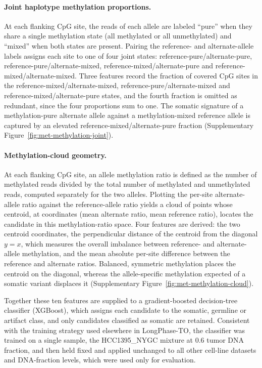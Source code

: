 \documentclass[pdflatex,sn-nature]{sn-jnl}
\begin{document}
\paragraph{Joint haplotype methylation proportions.} At each flanking CpG site, the reads of each allele are labeled ``pure'' when they share a single methylation state (all methylated or all unmethylated) and ``mixed'' when both states are present. Pairing the reference- and alternate-allele labels assigns each site to one of four joint states: reference-pure/alternate-pure, reference-pure/alternate-mixed, reference-mixed/alternate-pure and reference-mixed/alternate-mixed. Three features record the fraction of covered CpG sites in the reference-mixed/alternate-mixed, reference-pure/alternate-mixed and reference-mixed/alternate-pure states, and the fourth fraction is omitted as redundant, since the four proportions sum to one. The somatic signature of a methylation-pure alternate allele against a methylation-mixed reference allele is captured by an elevated reference-mixed/alternate-pure fraction (Supplementary Figure~\ref{fig:met-methylation-joint}).

\paragraph{Methylation-cloud geometry.} At each flanking CpG site, an allele methylation ratio is defined as the number of methylated reads divided by the total number of methylated and unmethylated reads, computed separately for the two alleles. Plotting the per-site alternate-allele ratio against the reference-allele ratio yields a cloud of points whose centroid, at coordinates (mean alternate ratio, mean reference ratio), locates the candidate in this methylation-ratio space. Four features are derived: the two centroid coordinates, the perpendicular distance of the centroid from the diagonal \(y=x\), which measures the overall imbalance between reference- and alternate-allele methylation, and the mean absolute per-site difference between the reference and alternate ratios. Balanced, symmetric methylation places the centroid on the diagonal, whereas the allele-specific methylation expected of a somatic variant displaces it (Supplementary Figure~\ref{fig:met-methylation-cloud}).

Together these ten features are supplied to a gradient-boosted decision-tree classifier (XGBoost), which assigns each candidate to the somatic, germline or artifact class, and only candidates classified as somatic are retained. Consistent with the training strategy used elsewhere in LongPhase-TO, the classifier was trained on a single sample, the HCC1395\_NYGC mixture at 0.6 tumor DNA fraction, and then held fixed and applied unchanged to all other cell-line datasets and DNA-fraction levels, which were used only for evaluation.
\end{document}
